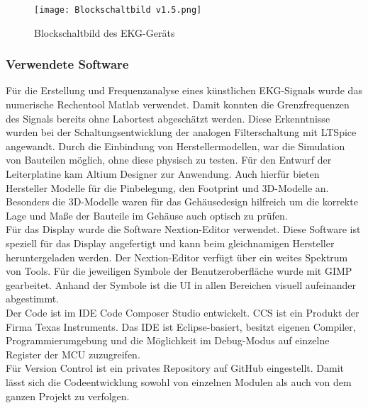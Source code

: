 \begin{figure} [h]
	\texttt{[image: Blockschaltbild v1.5.png]}
	\caption{Blockschaltbild des EKG-Geräts}
	\label{fig_Blockschaltbild} 
\end{figure}



\subsubsection{Verwendete Software}
Für die Erstellung und Frequenzanalyse eines künstlichen EKG-Signals wurde das numerische Rechentool Matlab verwendet. Damit konnten die Grenzfrequenzen des Signals bereits ohne Labortest abgeschätzt werden. Diese Erkenntnisse wurden bei der Schaltungsentwicklung der analogen Filterschaltung mit LTSpice angewandt. Durch die Einbindung von Herstellermodellen, war die Simulation von Bauteilen möglich, ohne diese physisch zu testen. Für den Entwurf der Leiterplatine kam Altium Designer zur Anwendung. Auch hierfür bieten Hersteller Modelle für die Pinbelegung, den Footprint und 3D-Modelle an. Besonders die 3D-Modelle waren für das Gehäusedesign hilfreich um die korrekte Lage und Maße der Bauteile im Gehäuse auch optisch zu prüfen.\\
Für das Display wurde die Software Nextion-Editor verwendet. Diese Software ist speziell für das Display angefertigt und kann beim gleichnamigen Hersteller heruntergeladen werden. Der Nextion-Editor verfügt über ein weites Spektrum von Tools. Für die jeweiligen Symbole der Benutzeroberfläche wurde mit GIMP gearbeitet. Anhand der Symbole ist die UI in allen Bereichen visuell aufeinander abgestimmt.\\
Der Code ist im IDE Code Composer Studio entwickelt. CCS ist ein Produkt der Firma Texas Instruments. Das IDE ist Eclipse-basiert, besitzt eigenen Compiler, Programmierumgebung und die Möglichkeit im Debug-Modus auf einzelne Register der MCU zuzugreifen.\\
Für Version Control ist ein privates Repository auf GitHub eingestellt. Damit lässt sich die Codeentwicklung sowohl von einzelnen Modulen als auch von dem ganzen Projekt zu verfolgen.\\

